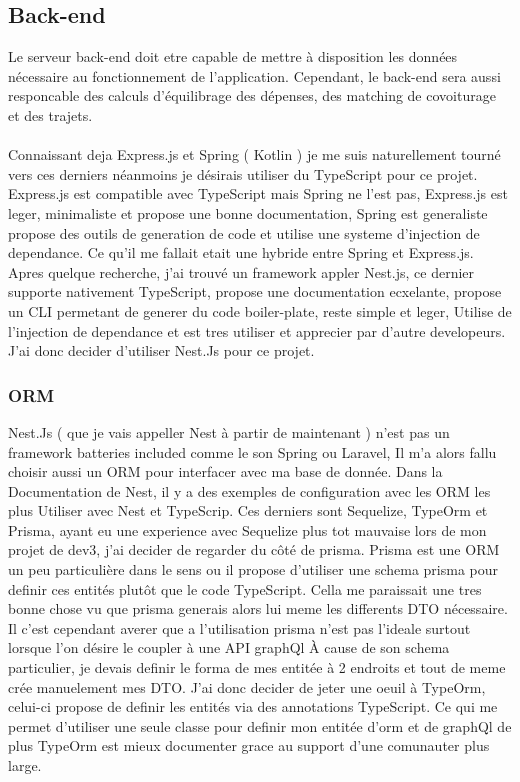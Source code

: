 \subsection{Back-end}\label{subsec:back-end}
Le serveur back-end doit etre capable de mettre à disposition les données nécessaire au fonctionnement de l'application.
Cependant, le back-end sera aussi responcable des calculs d'équilibrage des dépenses, des matching de covoiturage et des trajets.\\\\
Connaissant deja Express.js et Spring ( Kotlin ) je me suis naturellement tourné vers ces derniers néanmoins je désirais utiliser du TypeScript pour ce projet.
Express.js est compatible avec TypeScript mais Spring ne l'est pas, Express.js est leger, minimaliste et propose une bonne documentation,
Spring est generaliste propose des outils de generation de code et utilise une systeme d'injection de dependance.
Ce qu'il me fallait etait une hybride entre Spring et Express.js.
Apres quelque recherche, j'ai trouvé un framework appler Nest.js, ce dernier supporte nativement TypeScript, propose une documentation ecxelante,
propose un CLI permetant de generer du code boiler-plate, reste simple et leger, Utilise de l'injection de dependance et est tres utiliser et apprecier par d'autre developeurs.
J'ai donc decider d'utiliser Nest.Js pour ce projet.

\subsubsection{ORM}
Nest.Js ( que je vais appeller Nest à partir de maintenant ) n'est pas un framework batteries included comme le son Spring ou Laravel,
Il m'a alors fallu choisir aussi un ORM pour interfacer avec ma base de donnée.
Dans la Documentation de Nest, il y a des exemples de configuration avec les ORM les plus Utiliser avec Nest et TypeScrip.
Ces derniers sont Sequelize, TypeOrm et Prisma,
ayant eu une experience avec Sequelize plus tot mauvaise lors de mon projet de dev3, j'ai decider de regarder du côté de prisma.
Prisma est une ORM un peu particulière dans le sens ou il propose d'utiliser une schema prisma pour definir ces entités plutôt que le code TypeScript.
Cella me paraissait une tres bonne chose vu que prisma generais alors lui meme les differents DTO nécessaire.
Il c'est cependant averer que a l'utilisation prisma n'est pas l'ideale surtout lorsque l'on désire le coupler à une API graphQl
À cause de son schema particulier, je devais definir le forma de mes entitée à 2 endroits et tout de meme crée manuelement mes DTO.
J'ai donc decider de jeter une oeuil à TypeOrm, celui-ci propose de definir les entités via des annotations TypeScript.
Ce qui me permet d'utiliser une seule classe pour definir mon entitée d'orm et de graphQl de plus TypeOrm est mieux
documenter grace au support d'une comunauter plus large.


